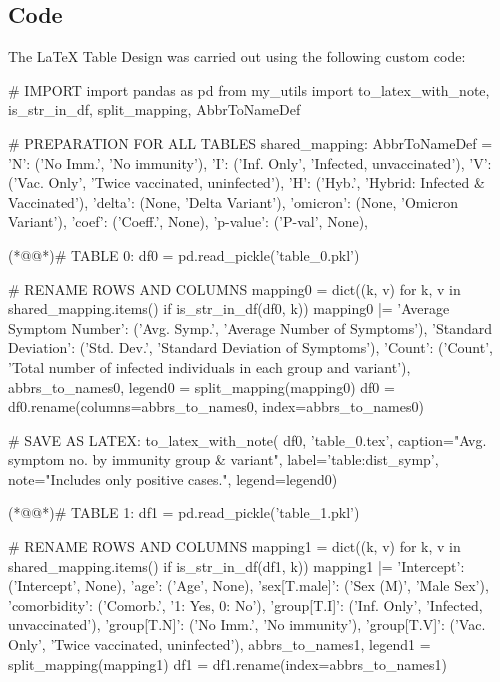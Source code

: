 \documentclass[11pt]{article}
\begin{document}
\subsection{{Code}}
The LaTeX Table Design was carried out using the following custom code:

\begin{python}

# IMPORT
import pandas as pd
from my_utils import to_latex_with_note, is_str_in_df, split_mapping, AbbrToNameDef

# PREPARATION FOR ALL TABLES
shared_mapping: AbbrToNameDef = {
    'N': ('No Imm.', 'No immunity'),
    'I': ('Inf. Only', 'Infected, unvaccinated'),
    'V': ('Vac. Only', 'Twice vaccinated, uninfected'),
    'H': ('Hyb.', 'Hybrid: Infected & Vaccinated'),
    'delta': (None, 'Delta Variant'),
    'omicron': (None, 'Omicron Variant'),
    'coef': ('Coeff.', None),
    'p-value': ('P-val', None),
}

(*@@*)# TABLE 0:
df0 = pd.read_pickle('table_0.pkl')

# RENAME ROWS AND COLUMNS 
mapping0 = dict((k, v) for k, v in shared_mapping.items() if is_str_in_df(df0, k)) 
mapping0 |= {
    'Average Symptom Number': ('Avg. Symp.', 'Average Number of Symptoms'),
    'Standard Deviation': ('Std. Dev.', 'Standard Deviation of Symptoms'),
    'Count': ('Count', 'Total number of infected individuals in each group and variant'),
}
abbrs_to_names0, legend0 = split_mapping(mapping0)
df0 = df0.rename(columns=abbrs_to_names0, index=abbrs_to_names0)

# SAVE AS LATEX:
to_latex_with_note(
    df0, 'table_0.tex',
    caption="Avg. symptom no. by immunity group & variant", 
    label='table:dist_symp',
    note="Includes only positive cases.",
    legend=legend0)

(*@@*)# TABLE 1:
df1 = pd.read_pickle('table_1.pkl')

# RENAME ROWS AND COLUMNS 
mapping1 = dict((k, v) for k, v in shared_mapping.items() if is_str_in_df(df1, k)) 
mapping1 |= {
    'Intercept': ('Intercept', None),
    'age': ('Age', None),
    'sex[T.male]': ('Sex (M)', 'Male Sex'),
    'comorbidity': ('Comorb.', '1: Yes, 0: No'),
    'group[T.I]': ('Inf. Only', 'Infected, unvaccinated'),
    'group[T.N]': ('No Imm.', 'No immunity'),
    'group[T.V]': ('Vac. Only', 'Twice vaccinated, uninfected'),
}
abbrs_to_names1, legend1 = split_mapping(mapping1)
df1 = df1.rename(index=abbrs_to_names1)


\end{python}
\end{document}
